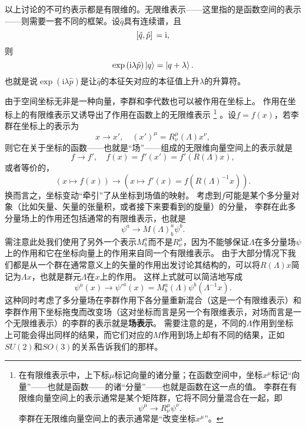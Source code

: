 \documentclass[hyperref, UTF8, a4paper]{ctexart}
\newcommand*{\ii}{\mathrm{i}}
\begin{document}
以上讨论的不可约表示都是有限维的。无限维表示——这里指的是函数空间的表示——则需要一套不同的框架。设$\hat{q}$具有连续谱，且
\begin{equation}
    \comm*{\hat{q}}{\hat{p}} = \ii,
\end{equation}
则
\begin{equation}
    \exp \left( \ii \lambda \hat{p} \right) \ket{q} = \ket{q + \lambda}.
\end{equation}
也就是说$\exp (\ii \lambda \hat{p})$是让$\hat{q}$的本征矢对应的本征值上升$\lambda$的升算符。

由于空间坐标无非是一种向量，李群和李代数也可以被作用在坐标上。
作用在坐标上的有限维表示又诱导出了作用在函数上的无限维表示%
\footnote{在有限维表示中，上下标$\mu$标记向量的诸分量；在函数空间中，坐标$x^\mu$标记“向量”——也就是函数——的诸“分量”——也就是函数在这一点的值。
李群在有限维向量空间上的表示通常是某个矩阵群，它将不同分量混合在一起，即
\[
    \psi^\mu \longrightarrow R^\mu_\nu \psi^\nu.    
\]
李群在无限维向量空间上的表示通常是“改变坐标$x^\mu$”。
}%
。设$f=f(x)$，若李群在坐标上的表示为
\[
    x \longrightarrow x', \quad (x')^\mu = R_\nu^\mu (\Lambda) x^\nu,
\]
则它在关于坐标的函数——也就是“场”——组成的无限维向量空间上的表示就是
\[
    f \longrightarrow f', \quad f(x) = f'(x') = f'(R(\Lambda) x),
\]
或者等价的，
\begin{equation}
    (x \mapsto f(x)) \longrightarrow (x \mapsto f'(x) = f(R(\Lambda)^{-1} x)).
    \label{eq:infinite-dim-rep}
\end{equation}
换而言之，坐标变动“牵引”了从坐标到场值的映射。
考虑到$f$可能是某个多分量对象（比如矢量、矢量的张量积，或者接下来要看到的旋量）的分量，
李群在此多分量场上的作用还包括通常的有限维表示，也就是
\[
    \psi^a \longrightarrow M(\Lambda)^a_b \psi^b.
\]
需注意此处我们使用了另外一个表示$M^a_b$而不是$R^\mu_\nu$，因为不能够保证$\Lambda$在多分量场$\psi$上的作用和它在坐标向量上的作用来自同一个有限维表示。
由于大部分情况下我们都是从一个群在通常意义上的矢量的作用出发讨论其结构的，可以将$R(\Lambda) x$简记为$\Lambda x$，也就是群元$\Lambda$在$x$上的作用。
这样上式就可以简洁地写成
\begin{equation}
    \psi^a(x) \longrightarrow {\psi'}^a (x) = M^a_b (\Lambda) \psi^b (\Lambda^{-1} x).
    \label{eq:wigner-transform}
\end{equation}
这种同时考虑了多分量场在李群作用下各分量重新混合（这是一个有限维表示）和李群作用下坐标拖曳而改变场（这对坐标而言是另一个有限维表示，对场而言是一个无限维表示）的李群的表示就是\textbf{场表示}。
需要注意的是，不同的$\Lambda$作用到坐标上可能会得出同样的结果，而它们对应的$M$作用到场上却有不同的结果，正如$SU(2)$和$SO(3)$的关系告诉我们的那样。
\end{document}
